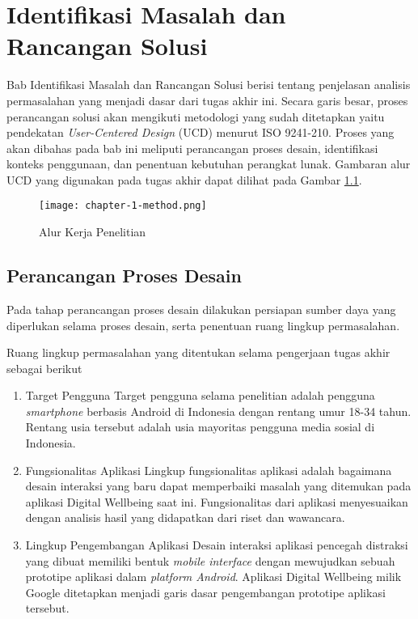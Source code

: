 \newcommand{\ccnormspacing}{\baselineskip=12pt}
\newcommand{\ccnormspacingcenter}{\centering\arraybackslash\ccnormspacing}


\chapter{Identifikasi Masalah dan Rancangan Solusi}


Bab Identifikasi Masalah dan Rancangan Solusi berisi tentang penjelasan analisis permasalahan yang menjadi dasar dari tugas akhir ini. Secara garis besar, proses perancangan solusi akan mengikuti metodologi yang sudah ditetapkan yaitu pendekatan \textit{User-Centered Design} (UCD) menurut ISO 9241-210. Proses yang akan dibahas pada bab ini meliputi perancangan proses desain, identifikasi konteks penggunaan, dan penentuan kebutuhan perangkat lunak. Gambaran alur UCD yang digunakan pada tugas akhir dapat dilihat pada Gambar \ref{fig:diagram_alur_kerja}.

\begin{figure}[h]
  \centering
  \texttt{[image: chapter-1-method.png]}
  \caption{Alur Kerja Penelitian}
  \label{fig:diagram_alur_kerja}
\end{figure}

\section{Perancangan Proses Desain}
\label{sec:perancangan_proses_desain}

Pada tahap perancangan proses desain dilakukan persiapan sumber daya yang diperlukan selama proses desain, serta penentuan ruang lingkup permasalahan.


Ruang lingkup permasalahan yang ditentukan selama pengerjaan tugas akhir sebagai berikut

\begin{enumerate}
  \item Target Pengguna
  \subitem Target pengguna selama penelitian adalah pengguna \textit{smartphone} berbasis Android di Indonesia dengan rentang umur 18-34 tahun. Rentang usia tersebut adalah usia mayoritas pengguna media sosial di Indonesia. \parencite{mediasosial2020} 
  
  \item Fungsionalitas Aplikasi
  \subitem Lingkup fungsionalitas aplikasi adalah bagaimana desain interaksi yang baru dapat memperbaiki masalah yang ditemukan pada aplikasi Digital Wellbeing saat ini. Fungsionalitas dari aplikasi menyesuaikan dengan analisis hasil yang didapatkan dari riset dan wawancara. 
   
  \item Lingkup Pengembangan Aplikasi
  \subitem Desain interaksi aplikasi pencegah distraksi yang dibuat memiliki bentuk \textit{mobile interface} dengan mewujudkan sebuah prototipe aplikasi dalam \textit{platform Android}. Aplikasi Digital Wellbeing milik Google ditetapkan menjadi garis dasar pengembangan prototipe aplikasi tersebut.

\end{enumerate}

